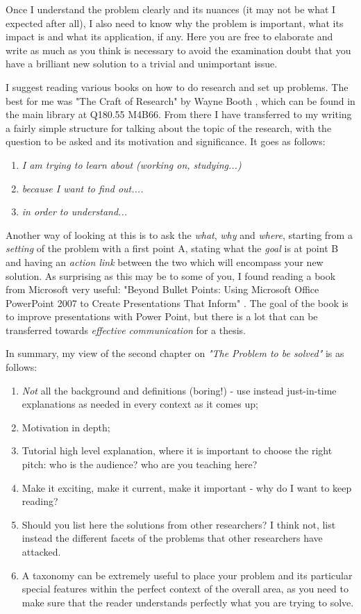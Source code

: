 Once I understand the problem clearly and its nuances (it may not be what I expected after all), I also need to know why the problem is important, what its impact is and what its application, if any. Here you are free to elaborate and write as much as you think is necessary to avoid the examination doubt that you have a brilliant new solution to a trivial and unimportant issue.

I suggest reading various books on how to do research and set up problems. The best for me was "The Craft of Research" by Wayne Booth \cite{booth1}, which can be found in the main library at Q180.55 M4B66. From there I have transferred to my writing a fairly simple structure for talking about the topic of the research, with the question to be asked and its motivation and significance. It goes as follows:
\begin{enumerate}
\item {\textit{I am trying to learn about (working on, studying...)}}
\item {\textit{because I want to find out....}}
\item {\textit{in order to understand...}}
\end{enumerate}

Another way of looking at this is to ask the
\textit{what}, \textit{why} and \textit{where}, starting from a \textit{setting} of the problem with a first point A, stating what the \textit{goal} is at point B and having an \textit{action link} between the two which will encompass your new solution. As surprising as this may be to some of you, I found reading a book from Microsoft very useful: "Beyond Bullet Points: Using Microsoft Office PowerPoint 2007 to Create Presentations That Inform" \cite {atkin}. The goal of the book is to improve presentations with Power Point, but there is a lot that can be transferred towards \textit{effective communication} for a thesis.

In summary, my view of the second chapter on
\textit{"The Problem to be solved"} is as follows:
\begin{enumerate}
\item {\textit{Not} all the background and definitions (boring!) - use instead just-in-time explanations as needed in every context as it comes up;}
\item {Motivation in depth;}
\item {Tutorial high level explanation, where it is important to choose the right pitch: who is the audience? who are you teaching here?}
\item {Make it exciting, make it current, make it important - why do I want to keep reading?}
\item {Should you list here the solutions from other researchers? I think not, list instead the different facets of the problems that other researchers have attacked.}
\item {A taxonomy can be extremely useful to place your problem and its particular special features within the perfect context of the overall area, as you need to make sure that the reader understands perfectly what you are trying to solve.}
\end{enumerate}


\setlength{\unitlength}{\savedunitlength}
